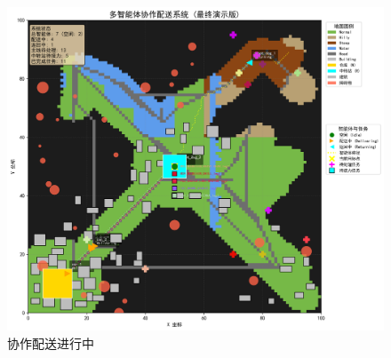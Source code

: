 \documentclass[12pt,a4paper]{article}
\begin{document}
\begin{figure}[h]
    \hfill
    \begin{minipage}[t]{0.3\textwidth}
        \centering
        \includegraphics[width=\textwidth]{visualization_snapshots/3.png}
        \caption{协作配送进行中}
    \end{minipage}
    
    \label{fig:visualization-snapshots-1}
\end{figure}
\end{document}
